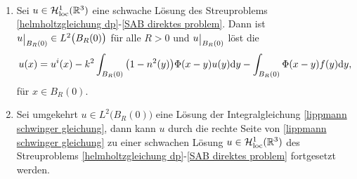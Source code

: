 \begin{satz}\label{satz: lippmann schwinger}\
	\begin{enumerate}[label=(\alph*)]
		\item Sei \(u\in\mathcal{H}_{\mathrm{loc}}^1(\mathbb{R}^3)\) eine schwache Lösung des Streuproblems \eqref{helmholtzgleichung dp}-\eqref{SAB direktes problem}. Dann ist \(u\restrict{B_R(0)}\in L^2\big(B_R(0)\big)\) für alle \(R>0\) und \(u\restrict{B_R(0)}\) löst die 
		\begin{equation}
			\label{lippmann schwinger gleichung}
			u(x)=u^i(x)-k^2\int_{B_R(0)}\big(1-n^2(y)\big)\Phi(x-y)u(y)\mathrm{d}y-\int_{B_R(0)}\Phi(x-y)f(y)\mathrm{d}y,
		\end{equation}
		für \(x\in B_R(0)\).
		\item Sei umgekehrt \(u\in L^2\big(B_R(0)\big)\) eine Lösung der Integralgleichung \eqref{lippmann schwinger gleichung}, dann kann \(u\) durch die rechte Seite von \eqref{lippmann schwinger gleichung} zu einer schwachen Lösung \(u\in\mathcal{H}_{\mathrm{loc}}^1(\mathbb{R}^3)\) des Streuproblems \eqref{helmholtzgleichung dp}-\eqref{SAB direktes problem} fortgesetzt werden.
	\end{enumerate}
\end{satz}
